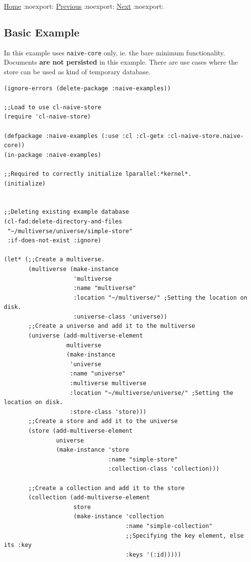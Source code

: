 \documentclass[11pt]{article}
\begin{document}
\href{home.org}{Home} :noexport: \href{exmamples.org}{Previous} :noexport: \href{basic-example.org}{Next​} :noexport:
\subsection{Basic Example}
\label{sec:orgdbc5e3c}

In this example uses \texttt{naive-core} only, ie. the bare minimum
functionality. Documents \textbf{\textbf{are not persisted}} in this example. There are
use cases where the store can be used as kind of temporary database.

\begin{verbatim}
(ignore-errors (delete-package :naive-examples))

;;Load to use cl-naive-store
(require 'cl-naive-store)

(defpackage :naive-examples (:use :cl :cl-getx :cl-naive-store.naive-core))
(in-package :naive-examples)

;;Required to correctly initialize lparallel:*kernel*.
(initialize)


;;Deleting existing example database
(cl-fad:delete-directory-and-files
 "~/multiverse/universe/simple-store"
 :if-does-not-exist :ignore)

(let* (;;Create a multiverse.
       (multiverse (make-instance
                    'multiverse
                    :name "multiverse"
                    :location "~/multiverse/" ;Setting the location on disk.
                    :universe-class 'universe))
       ;;Create a universe and add it to the multiverse
       (universe (add-multiverse-element
                  multiverse
                  (make-instance
                   'universe
                   :name "universe"
                   :multiverse multiverse
                   :location "~/multiverse/universe/" ;Setting the location on disk.
                   :store-class 'store)))
       ;;Create a store and add it to the universe
       (store (add-multiverse-element
               universe
               (make-instance 'store
                              :name "simple-store"
                              :collection-class 'collection)))

       ;;Create a collection and add it to the store
       (collection (add-multiverse-element
                    store
                    (make-instance 'collection
                                   :name "simple-collection"
                                   ;;Specifying the key element, else its :key
                                   :keys '(:id)))))


\end{verbatim}
\end{document}
